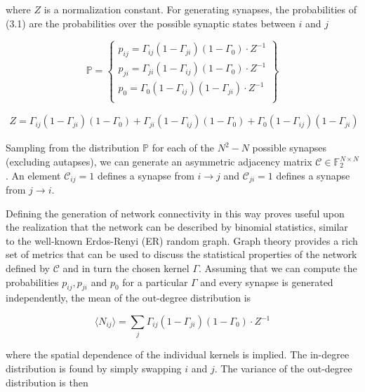 \documentclass{ucetd}
\begin{document}
where $Z$ is a normalization constant. For generating synapses, the probabilities of (3.1) are the probabilities over the possible synaptic states between $i$ and $j$

\begin{equation}
    \mathbb{P} = \left\{\begin{array}{lr}
        p_{ij} = \Gamma_{ij}(1-\Gamma_{ji})(1-\Gamma_{0})\cdot Z^{-1}\\
        p_{ji} = \Gamma_{ji}(1-\Gamma_{ij})(1-\Gamma_{0})\cdot Z^{-1}\\
        p_{0} = \Gamma_{0}(1-\Gamma_{ij})(1-\Gamma_{ji})\cdot Z^{-1}\\
        \end{array}\right\}
\end{equation}
  
\begin{align*}
Z = \Gamma_{ij}(1-\Gamma_{ji})(1-\Gamma_{0}) + \Gamma_{ji}(1-\Gamma_{ij})(1-\Gamma_{0}) + \Gamma_{0}(1-\Gamma_{ij})(1-\Gamma_{ji})
\end{align*}

Sampling from the distribution $\mathbb{P}$ for each of the $N^{2} - N$ possible synapses (excluding autapses), we can generate an asymmetric adjacency matrix $\mathcal{C} \in \mathbb{F}_{2}^{N\times N}$. An element $\mathcal{C}_{ij} = 1$ defines a synapse from $i\rightarrow j$ and $\mathcal{C}_{ji} = 1$ defines a synapse from $j\rightarrow i$.

Defining the generation of network connectivity in this way proves useful upon the realization that the network can be described by binomial statistics, similar to the well-known Erdos-Renyi (ER) random graph. Graph theory provides a rich set of metrics that can be used to discuss the statistical properties of the network defined by $\mathcal{C}$ and in turn the chosen kernel $\Gamma$. Assuming that we can compute the probabilities $p_{ij}, p_{ji}$ and $p_{0}$ for a particular $\Gamma$ and every synapse is generated independently, the mean of the out-degree distribution is

\begin{equation}
\langle N_{ij} \rangle = \sum_{j} \Gamma_{ij}(1-\Gamma_{ji})(1-\Gamma_{0})\cdot Z^{-1}
\end{equation}

where the spatial dependence of the individual kernels is implied. The in-degree distribution is found by simply swapping $i$ and $j$. The variance of the out-degree distribution is then
\end{document}
